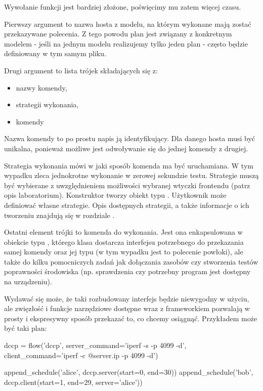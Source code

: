 \documentclass[00-praca-magisterska.tex]{subfiles}
\begin{document}
Wywołanie funkcji  jest bardziej złożone, poświęcimy mu
zatem więcej czasu.

Pierwszy argument to nazwa hosta z modelu, na którym wykonane mają zostać
przekazywane polecenia. Z tego powodu plan jest związany z konkretnym modelem -
jeśli na jednym modelu realizujemy tylko jeden plan - często będzie definiowany
w tym samym pliku.

Drugi argument to lista trójek składających się z:
\begin{itemize}
\item nazwy komendy,
\item strategii wykonania,
\item komendy
\end{itemize}

Nazwa komendy to po prostu napis ją identyfikujący. Dla danego hosta musi być
unikalna, ponieważ możliwe jest odwoływanie się do jednej komendy z drugiej.

Strategia wykonania mówi w jaki sposób komenda ma być uruchamiana. W tym
wypadku  zleca jednokrotne wykonanie w zerowej sekundzie testu.
Strategie muszą być wybierane z uwzględnieniem możliwości wybranej wtyczki
frontendu (patrz opis laboratorium). Konstruktor  tworzy obiekt typu
. Użytkownik może definiować własne strategie. Opis dostępnych
strategii, a także informacje o ich tworzeniu znajdują się w rozdziale
.

Ostatni element trójki to komenda do wykonania. Jest ona enkapsulowana w
obiekcie typu , którego klasa dostarcza interfejsu
potrzebnego do przekazania samej komendy oraz jej typu (w tym wypadku jest to
polecenie powłoki), ale także do kilku pomocniczych zadań jak dołączania
zasobów czy stworzenia testów poprawności środowiska (np. sprawdzenia czy
potrzebny program jest dostępny na urządzeniu).

Wydawać się może, że taki rozbudowany interfejs będzie niewygodny w użyciu, ale
zwięzłość i funkcje narzędziowe dostępne wraz z frameworkiem pozwalają w prosty
i ekspresywny sposób przekazać to, co chcemy osiągnąć. Przykładem może być taki
plan:

\begin{pythoncode}
  dccp = flow('dccp',
      server_command='iperf -s -p 4099 -d',
      client_command='iperf -c @{server.ip} -p 4099 -d')

  append_schedule('alice', dccp.server(start=0, end=30))
  append_schedule('bob',   dccp.client(start=1, end=29, server='alice'))
\end{pythoncode}
\end{document}
